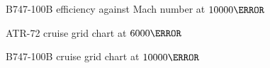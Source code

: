 \begin{figure}[b]
\centering

\caption{B747-100B efficiency against Mach number at $\si{10000}{\meter}$}
\label{fig:EfficiencyB747}
\end{figure}

\begin{figure}[t]
\centering

\caption{ATR-72 cruise grid chart at $\si{6000}{\meter}$}
\label{fig:SpecificRangeATR}
\end{figure}

\begin{figure}[b]
\centering

\caption{B747-100B cruise grid chart at $\si{10000}{\meter}$}
\label{fig:SpecificRangeB747}
\end{figure}